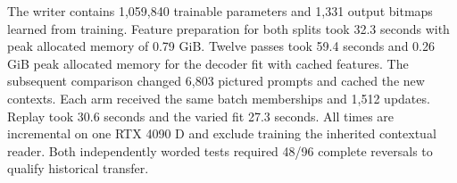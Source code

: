 The writer contains 1,059,840 trainable parameters and 1,331 output bitmaps learned from training. Feature preparation for both splits took 32.3 seconds with peak allocated memory of 0.79 GiB. Twelve passes took 59.4 seconds and 0.26 GiB peak allocated memory for the decoder fit with cached features. The subsequent comparison changed 6,803 pictured prompts and cached the new contexts. Each arm received the same batch memberships and 1,512 updates. Replay took 30.6 seconds and the varied fit 27.3 seconds. All times are incremental on one RTX 4090 D and exclude training the inherited contextual reader. Both independently worded tests required 48/96 complete reversals to qualify historical transfer.
